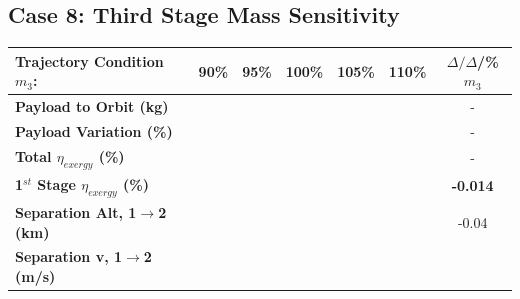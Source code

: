 \subsection{Case 8: Third Stage Mass Sensitivity}\label{sec:m3noReturn}



\begin{table}[ht] %
	\centering
	
	\begin{tabular}{l c c c c c c} 
		\hline \textbf{Trajectory Condition}   \qquad  $m_{3}$:
		&90\%
		&95\%
		&100\%
		&105\%
		&110\%
		& $\Delta/\Delta$/\%$m_{3}$
		\\
		\hline \textbf{Payload to Orbit (kg)}
		& \textbf{\PayloadToOrbitmThreeNinetyNoReturn}
		& \textbf{\PayloadToOrbitmThreeNinetyFiveNoReturn}
		& \textbf{\PayloadToOrbitmThreeStandardNoReturn}
		& \textbf{\PayloadToOrbitmThreeOneHundredFiveNoReturn}
		& \textbf{\PayloadToOrbitmThreeOneHundredTenNoReturn}
		& -
		\\
		\textbf{Payload Variation (\%)}
		& \PayloadVarmThreeNinetyNoReturn
		& \PayloadVarmThreeNinetyFiveNoReturn
		& \PayloadVarmThreeStandardNoReturn
		& \PayloadVarmThreeOneHundredFiveNoReturn
		& \PayloadVarmThreeOneHundredTenNoReturn
		& -
		\\
		\textbf{Total $\eta_{exergy}$ (\%)}
		& \textbf{\totalExergyEffmThreeNinetyNoReturn}
		& \textbf{\totalExergyEffmThreeNinetyFiveNoReturn}
		& \textbf{\totalExergyEffmThreeStandardNoReturn}
		& \textbf{\totalExergyEffmThreeOneHundredFiveNoReturn}
		& \textbf{\totalExergyEffmThreeOneHundredTenNoReturn}
		& -
		\\
		\hline 
		\textbf{1$^{st}$ Stage $\eta_{exergy}$ (\%)}
		& \textbf{\firstExergyEffmThreeNinetyNoReturn}
		& \textbf{\firstExergyEffmThreeNinetyFiveNoReturn}
		& \textbf{\firstExergyEffmThreeStandardNoReturn}
		& \textbf{\firstExergyEffmThreeOneHundredFiveNoReturn}
		& \textbf{\firstExergyEffmThreeOneHundredTenNoReturn}
		& \textbf{-0.014}
		\\
		\textbf{Separation Alt, 1$\rightarrow$2 (km)}
		& \firstsecondSeparationAltmThreeNinetyNoReturn
		& \firstsecondSeparationAltmThreeNinetyFiveNoReturn
		& \firstsecondSeparationAltmThreeStandardNoReturn
		& \firstsecondSeparationAltmThreeOneHundredFiveNoReturn
		& \firstsecondSeparationAltmThreeOneHundredTenNoReturn
		&-0.04
		\\
		\textbf{Separation v, 1$\rightarrow$2 (m/s)}
		& \firstsecondSeparationvmThreeNinetyNoReturn
		& \firstsecondSeparationvmThreeNinetyFiveNoReturn

\end{tabular}
\end{table}
